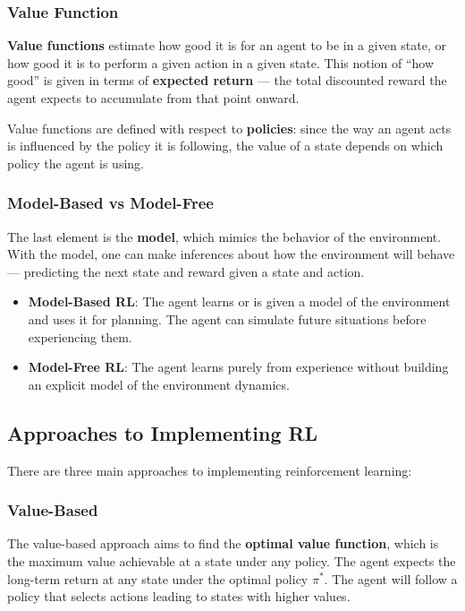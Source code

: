 \documentclass[11pt,a4paper]{article}
\begin{document}
\subsubsection{Value Function}

\textbf{Value functions} estimate how good it is for an agent to be in a given state, or how good it is to perform a given action in a given state. This notion of ``how good'' is given in terms of \textbf{expected return} --- the total discounted reward the agent expects to accumulate from that point onward.

Value functions are defined with respect to \textbf{policies}: since the way an agent acts is influenced by the policy it is following, the value of a state depends on which policy the agent is using.

\subsubsection{Model-Based vs Model-Free}

The last element is the \textbf{model}, which mimics the behavior of the environment. With the model, one can make inferences about how the environment will behave --- predicting the next state and reward given a state and action.

\begin{itemize}
    \item \textbf{Model-Based RL}: The agent learns or is given a model of the environment and uses it for planning. The agent can simulate future situations before experiencing them.
    \item \textbf{Model-Free RL}: The agent learns purely from experience without building an explicit model of the environment dynamics.
\end{itemize}

\subsection{Approaches to Implementing RL}

There are three main approaches to implementing reinforcement learning:

\subsubsection{Value-Based}

The value-based approach aims to find the \textbf{optimal value function}, which is the maximum value achievable at a state under any policy. The agent expects the long-term return at any state under the optimal policy $\pi^*$. The agent will follow a policy that selects actions leading to states with higher values.
\end{document}
